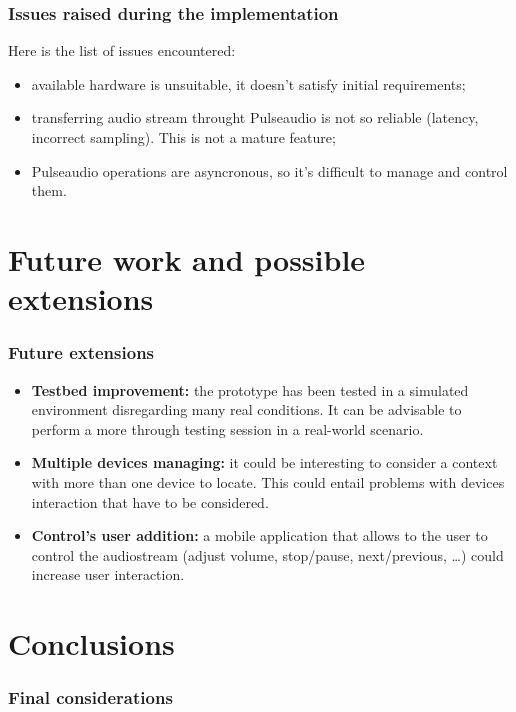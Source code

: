 \documentclass{beamer}
\begin{document}
	\begin{frame}
		\frametitle{Issues raised during the implementation}
		Here is the list of issues encountered:
		\begin{itemize}
		\item available hardware is unsuitable, it doesn't satisfy initial requirements;
		\item transferring audio stream throught Pulseaudio is not so reliable (latency, incorrect sampling). This is not a mature feature; 
		\item Pulseaudio operations are asyncronous, so it's difficult to manage and control them.
		\end{itemize}
	\end{frame}
	

\section{Future work and possible extensions}

	
	\begin{frame}
		\frametitle{Future extensions}
		\begin{itemize}
		\item \textbf{Testbed improvement:} the prototype has been tested in a simulated environment disregarding many real conditions. It can be advisable to perform a more through testing session in a real-world scenario. 
		\pause
		\item \textbf{Multiple devices managing:} it could be interesting to consider a context with more than one device to locate. This could entail problems with devices interaction that have to be considered.
		\pause
		\item \textbf{Control's user addition:} a mobile application that allows to the user to control the audiostream (adjust volume, stop/pause, next/previous, \ldots) could increase user interaction.
		\end{itemize}
	\end{frame}
	

\section{Conclusions}
	\begin{frame}
		\frametitle{Final considerations}
	\end{frame}
\end{document}
